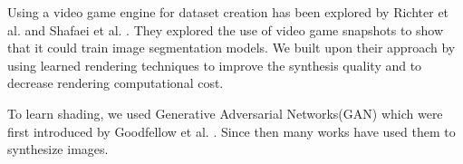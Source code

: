\documentclass[10pt,twocolumn,letterpaper]{article}
\begin{document}


Using a video game engine for dataset creation has been explored by Richter et al. \cite{DBLP:journals/corr/RichterVRK16} and  Shafaei et al. \cite{DBLP:journals/corr/ShafaeiLS16}. They explored the use of video game snapshots to show that it could train image segmentation models. We built upon their approach by using learned rendering techniques to improve the synthesis quality and to decrease rendering computational cost.


To learn shading, we used Generative Adversarial Networks(GAN) which were first introduced by Goodfellow et al. \cite{goodfellow}. Since then many works have used them to synthesize images. 

\end{document}
